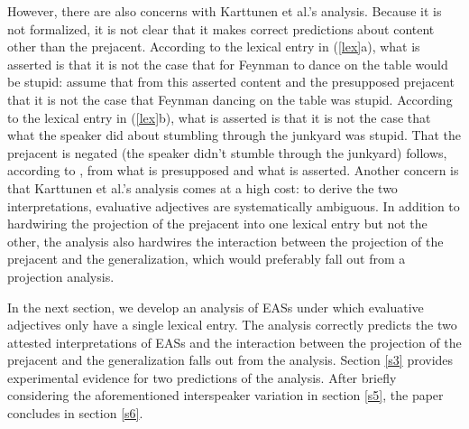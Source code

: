 \documentclass[11pt,fleqn]{article}
\newcommand{\6}{\mbox{$[\hspace*{-.6mm}[$}}
\newcommand{\9}{\mbox{$]\hspace*{-.6mm}]$}}
\newcommand{\citepos}[1]{\citeauthor{#1}'s \citeyear{#1}}
\begin{document}
However, there are also concerns with Karttunen et al.'s analysis. Because it is not formalized, it is not clear that it makes correct predictions about content other than the prejacent. According to the lexical entry in (\ref{lex}a), what is asserted is that it is not the case that for Feynman to dance on the table would be stupid: \citet[248]{karttunen-etal2014} assume that from this asserted content and the presupposed prejacent that it is not the case that Feynman dancing on the table was stupid. According to the lexical entry in (\ref{lex}b), what is asserted is that it is not the case that what the speaker did about stumbling through the junkyard was stupid. That the prejacent is negated (the speaker didn't stumble through the junkyard) follows, according to \citealt[249]{karttunen-etal2014}, from what is presupposed and what is asserted. Another concern is that Karttunen et al.'s analysis comes at a high cost: to derive the two interpretations, evaluative adjectives are systematically ambiguous. In addition to hardwiring the projection of the prejacent into one lexical entry but not the other, the analysis also hardwires the interaction between the projection of the prejacent and the generalization, which  would preferably fall out from a projection analysis. 

In the next section, we develop an analysis of EASs under which evaluative adjectives only have a single lexical entry. The analysis correctly predicts the two attested interpretations of EASs and the  interaction between the projection of the prejacent and the generalization falls out from the analysis. Section \ref{s3} provides experimental evidence for two predictions of the analysis. After briefly considering the aforementioned interspeaker variation in section \ref{s5}, the paper concludes  in section \ref{s6}.



\end{document}
